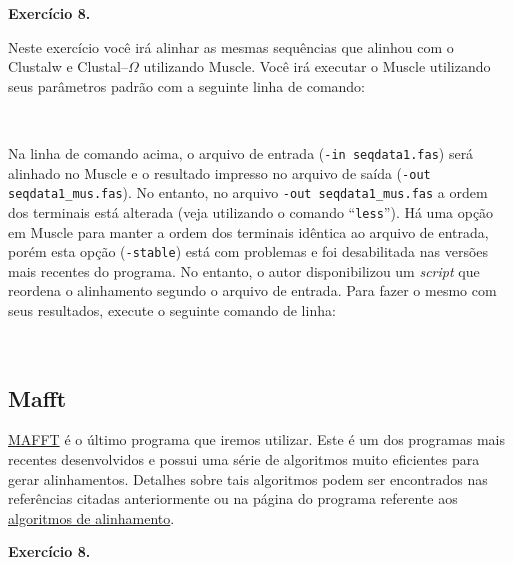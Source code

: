 \begin{refsection}
\begin{blackBlock}{\textbf{Exercício 8.}}\label{tut8:ex:8.4}

Neste exercício você irá alinhar as mesmas sequências que alinhou com o Clustalw e Clustal--$\Omega$ utilizando Muscle. Você irá executar o Muscle utilizando seus parâmetros padrão com a seguinte linha de comando:

\scriptsize
{}\\
\normalsize

\end{blackBlock}

Na linha de comando acima, o arquivo de entrada (\texttt{-in seqdata1.fas}) será alinhado no Muscle e o resultado impresso no arquivo de saída (\texttt{-out seqdata1\_mus.fas}). No entanto,  no arquivo \texttt{-out seqdata1\_mus.fas} a ordem dos terminais está alterada (veja utilizando o comando ``\texttt{less}''). Há uma opção em Muscle para manter a ordem dos terminais idêntica ao arquivo de entrada, porém esta opção (\texttt{-stable}) está com problemas e foi desabilitada nas versões mais recentes do programa. No entanto, o autor disponibilizou um \textit{script} que reordena o alinhamento segundo o arquivo de entrada. Para fazer o mesmo com seus resultados, execute o seguinte comando de linha: 

\scriptsize
{}\\
\normalsize

\subsection{Mafft}\label{tut8:msa:mafft}

\href{http://mafft.cbrc.jp/alignment/software/}{MAFFT} \parencite{Katoh_et_al_2002, Katoh_and_Standley_2013} é o último programa que iremos utilizar. Este é um dos programas mais recentes desenvolvidos e possui uma série de algoritmos muito eficientes para gerar alinhamentos. Detalhes sobre tais algoritmos podem ser encontrados nas referências citadas anteriormente ou na página do programa referente aos \href{http://mafft.cbrc.jp/alignment/software/algorithms/algorithms.html}{algoritmos de alinhamento}.\\


\begin{blackBlock}{\textbf{Exercício 8.}}\label{tut8:ex:8.5}


\end{blackBlock}
\end{refsection}
